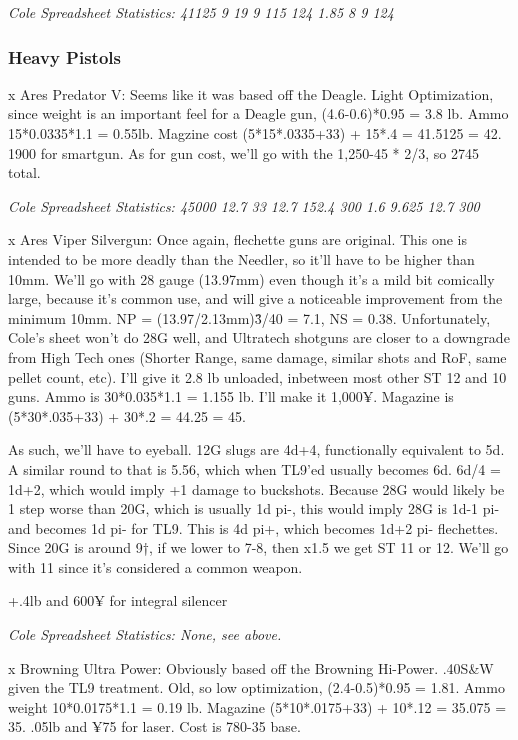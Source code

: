 \begin{multicols*}{2}
	\textit{\textcolor{OliveGreen}{Cole Spreadsheet Statistics: 41125 9 19 9 115 124 1.85 8 9 124}}
	
	\subsubsection{Heavy Pistols}
	
	x Ares Predator V: Seems like it was based off the Deagle. Light Optimization, since weight is an important feel for a Deagle gun, (4.6-0.6)*0.95 = 3.8 lb. Ammo 15*0.0335*1.1 = 0.55lb. Magzine cost (5*15*.0335+33) + 15*.4 = 41.5125 = 42. 1900 for smartgun. As for gun cost, we'll go with the 1,250-45 * 2/3, so 2745 total.
	
	\textit{\textcolor{OliveGreen}{Cole Spreadsheet Statistics: 45000 12.7 33 12.7 152.4 300 1.6 9.625 12.7 300}}
	
	x Ares Viper Silvergun: Once again, flechette guns are original. This one is intended to be more deadly than the Needler, so it'll have to be higher than 10mm. We'll go with 28 gauge (13.97mm) even though it's a mild bit comically large, because it's common use, and will give a noticeable improvement from the minimum 10mm. NP = (13.97/2.13mm)\^3/40 = 7.1, NS = 0.38. Unfortunately, Cole's sheet won't do 28G well, and Ultratech shotguns are closer to a downgrade from High Tech ones (Shorter Range, same damage, similar shots and RoF, same pellet count, etc). I'll give it 2.8 lb unloaded, inbetween most other ST 12 and 10 guns. Ammo is 30*0.035*1.1 = 1.155 lb. I'll make it 1,000¥. Magazine is (5*30*.035+33) + 30*.2 = 44.25 = 45.
	
	As such, we'll have to eyeball. 12G slugs are 4d+4, functionally equivalent to 5d. A similar round to that is 5.56, which when TL9'ed usually becomes 6d. 6d/4 = 1d+2, which would imply +1 damage to buckshots. Because 28G would likely be 1 step worse than 20G, which is usually 1d pi-, this would imply 28G is 1d-1 pi- and becomes 1d pi- for TL9. This is 4d pi+, which becomes 1d+2 pi- flechettes. Since 20G is around 9†, if we lower to 7-8, then x1.5 we get ST 11 or 12. We'll go with 11 since it's considered a common weapon.
	
	+.4lb and 600¥ for integral silencer
	
	\textit{\textcolor{OliveGreen}{Cole Spreadsheet Statistics: None, see above.}}
	
	x Browning Ultra Power: Obviously based off the Browning Hi-Power. .40S\&W given the TL9 treatment. Old, so low optimization, (2.4-0.5)*0.95 = 1.81. Ammo weight 10*0.0175*1.1 = 0.19 lb. Magazine (5*10*.0175+33) + 10*.12 = 35.075 = 35. .05lb and ¥75 for laser. Cost is 780-35 base.
	

\end{multicols*}
